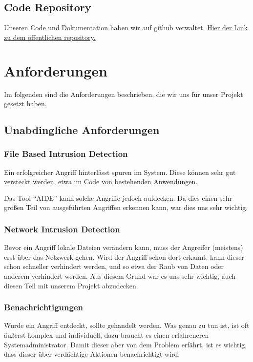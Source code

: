 \documentclass{article}
\begin{document}
\subsection{Code Repository}
Unseren Code und Dokumentation haben wir auf github verwaltet. \href{https://github.com/rubenMiller/intrusion-detection-pi}{Hier der Link zu dem öffentlichen repository.}

\section{Anforderungen}
Im folgenden sind die Anforderungen beschrieben, die wir uns für unser Projekt gesetzt haben.

\subsection{Unabdingliche Anforderungen}
\subsubsection{File Based Intrusion Detection}
Ein erfolgreicher Angriff hinterlässt spuren im System. Diese können sehr gut versteckt werden, etwa im Code von bestehenden Anwendungen.

Das Tool ``AIDE'' kann solche Angriffe jedoch aufdecken. Da dies einen sehr großen Teil von ausgeführten Angriffen erkennen kann, war dies uns sehr wichtig.

\subsubsection{Network Intrusion Detection}
Bevor ein Angriff lokale Dateien verändern kann, muss der Angreifer (meistens) erst über das Netzwerk gehen. Wird der Angriff schon dort erkannt, kann dieser schon schneller verhindert werden, und so etwa der Raub von Daten oder anderem verhindert werden. Aus diesem Grund war es uns sehr wichtig, auch diesen Teil mit unserem Projekt abzudecken.

\subsubsection{Benachrichtigungen}
Wurde ein Angriff entdeckt, sollte gehandelt werden. Was genau zu tun ist, ist oft äußerst komplex und individuell, dazu braucht es einen erfahreneren Systemadministrator. Damit dieser aber von dem Problem erfährt, ist es wichtig, dass dieser über verdächtige Aktionen benachrichtigt wird.
\end{document}
